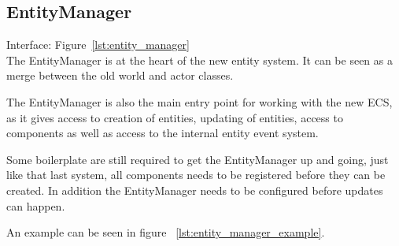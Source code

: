 \subsection{EntityManager}
Interface: Figure~\ref{lst:entity_manager}\\\noindent
The EntityManager is at the heart of the new entity system.
It can be seen as a merge between the old world and actor classes.

The EntityManager is also the main entry point for working with the new ECS,
as it gives access to creation of entities, updating of entities, access to components as well as access to the internal entity event system.

Some boilerplate are still required to get the EntityManager up and going, 
just like that last system, all components needs to be registered before they can be created.
In addition the EntityManager needs to be configured before updates can happen.

An example can be seen in figure ~\ref{lst:entity_manager_example}.\\
